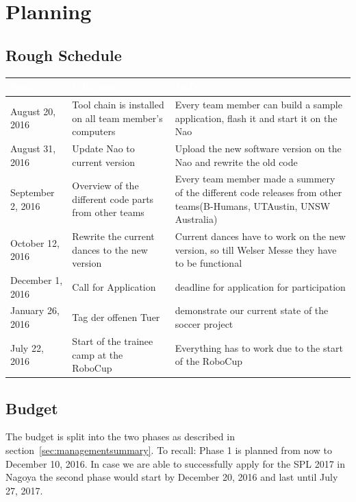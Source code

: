 \documentclass[12pt]{article}
\theoremstyle{definition}
\begin{document}
\section{Planning}
\subsection{Rough Schedule}

\begin{tabular}{|p{}|p{}|p{}|}
\hline
\cellcolor[gray]{0.5}\textcolor{white}{Date} & \cellcolor[gray]{0.45}\textcolor{white}{Milestone} & \cellcolor[gray]{0.5}\textcolor{white}{DoD} \\ \hline
August 20, 2016 & Tool chain is installed on all team member's computers & Every team member can build a sample application, flash it and start it on the Nao \\ \hline
August 31, 2016 & Update Nao to current version & Upload the new software version on the Nao and rewrite the old code \\ \hline
September 2, 2016 & Overview of the different code parts from other teams & Every team member made a summery of the different code releases from other teams(B-Humans, UTAustin, UNSW Australia) \\ \hline
October 12, 2016 & Rewrite the current dances to the new version & Current dances have to work on the new version, so till Welser Messe they have to be functional \\ \hline
December 1, 2016 & Call for Application & deadline for application for participation \\ \hline
January 26, 2016 & Tag der offenen Tuer & demonstrate our current state of the soccer project \\ \hline
July 22, 2016 & Start of the trainee camp at the RoboCup & Everything has to work due to the start of the RoboCup\\ \hline
\end{tabular}


\subsection{Budget}
The budget is split into the two phases as described in section~\ref{sec:managementsummary}. To recall: Phase 1 is planned from now to December 10, 2016. In case we are able to successfully apply for the SPL 2017 in Nagoya the second phase would start by December 20, 2016 and last until July 27, 2017.
\end{document}
